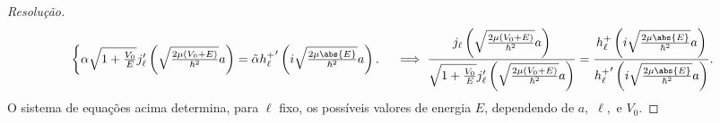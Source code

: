 \begin{proof}[Resolução]
\begin{equation*}
\begin{cases}
            \alpha \sqrt{1 + \frac{V_0}{E}}j'_\ell\left(\sqrt{\frac{2\mu(V_0 + E)}{\hbar^2}} a\right) = \tilde{\alpha} {h^+_\ell}'\left(i\sqrt{\frac{2\mu\abs{E}}{\hbar^2}} a\right).
        \end{cases}
        \implies
        \frac{j_\ell\left(\sqrt{\frac{2\mu(V_0 + E)}{\hbar^2}} a\right)}{\sqrt{1 + \frac{V_0}{E}}j'_\ell\left(\sqrt{\frac{2\mu(V_0 + E)}{\hbar^2}} a\right)} = \frac{h^+_\ell\left(i\sqrt{\frac{2\mu\abs{E}}{\hbar^2}} a\right)}{{h^+_\ell}'\left(i\sqrt{\frac{2\mu\abs{E}}{\hbar^2}} a\right)}.
    \end{equation*}
    O sistema de equações acima determina, para \(\ell\) fixo, os possíveis valores de energia \(E\), dependendo de \(a,\) \(\ell,\) e \(V_0.\)
\end{proof}
